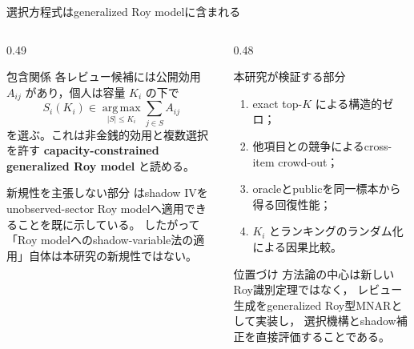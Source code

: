 \documentclass[aspectratio=169,10pt]{beamer}
\newcommand{\1}{\mathbf{1}}
\newcommand{\argmax}{\operatorname*{arg\,max}}
\begin{document}
\begin{frame}{選択方程式はgeneralized Roy modelに含まれる}
\begin{columns}[T,onlytextwidth]
\begin{column}{0.49\textwidth}
\begin{block}{包含関係}
\scriptsize
各レビュー候補には公開効用 $A_{ij}$ があり，個人は容量 $K_i$ の下で
\[
S_i(K_i)\in\argmax_{|S|\le K_i}\sum_{j\in S}A_{ij}
\]
を選ぶ。これは非金銭的効用と複数選択を許す
\textbf{capacity-constrained generalized Roy model} と読める。
\end{block}
\begin{alertblock}{新規性を主張しない部分}
\scriptsize
\textcite{dHaultfoeuille2010} はshadow IVを
unobserved-sector Roy modelへ適用できることを既に示している。
したがって「Roy modelへのshadow-variable法の適用」自体は本研究の新規性ではない。
\end{alertblock}
\end{column}
\begin{column}{0.48\textwidth}
\begin{block}{本研究が検証する部分}
\scriptsize
\begin{enumerate}
\item exact top-$K$ による構造的ゼロ；
\item 他項目との競争によるcross-item crowd-out；
\item oracleとpublicを同一標本から得る回復性能；
\item $K_i$ とランキングのランダム化による因果比較。
\end{enumerate}
\end{block}
\begin{alertblock}{位置づけ}
\scriptsize
方法論の中心は新しいRoy識別定理ではなく，
レビュー生成をgeneralized Roy型MNARとして実装し，
選択機構とshadow補正を直接評価することである。
\end{alertblock}
\end{column}
\end{columns}
\end{frame}
\end{document}
